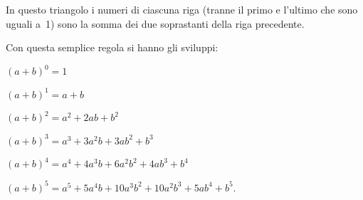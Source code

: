 In questo triangolo i numeri di ciascuna riga (tranne il primo e
l'ultimo che sono uguali a~1) sono la somma dei due
soprastanti della riga precedente.

Con questa semplice regola si hanno gli sviluppi:

\begin{itemize*}
\item \((a+b)^{0}=1\)
\item \((a+b)^{1}=a+b\)
\item \((a+b)^{2}=a^{2}+2{ab}+b^{2}\)
\item \((a+b)^{3}=a^{3}+3a^{2}b+3{ab}^{2}+b^{3}\)
\item \((a+b)^{4}=a^{4}+4a^{3}b+6a^{2}b^{2}+4{ab}^{3}+b^{4}\)
\item \((a+b)^{5}=a^{5}+5a^{4}b+10a^{3}b^{2}+10a^{2}b^{3}+5{ab}^{4}+b^{5}\).
\end{itemize*}



